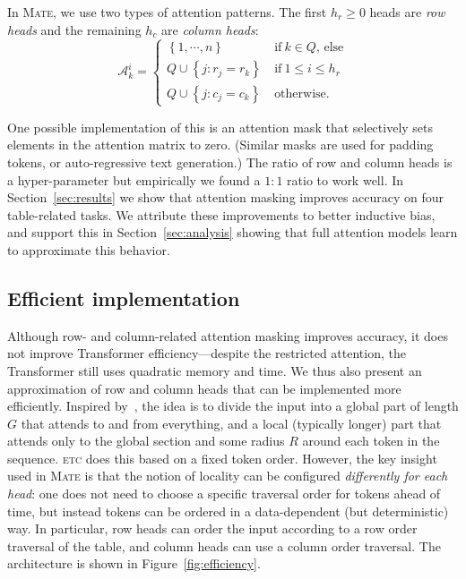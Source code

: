 \documentclass[11pt]{article}
\newcommand{\etc}{\textsc{etc}\xspace}
\newcommand{\model}{\textsc{Mate}\xspace}
\begin{document}
In \model, we use two types of attention patterns. The first $h_r\geq 0$ heads are \emph{row heads} and the remaining $h_c$ are \emph{column heads}:
\vspace{-2.5mm}
\[
\mathcal{A}^i_k = \begin{cases}
\left\{1,\cdots,n\right\} &~\text{if}~ k \in Q\text{, else} \\
Q \cup \left\{j : r_j = r_k\right\} &~\text{if}~ 1 \leq i \leq h_r \\
Q \cup \left\{j : c_j = c_k\right\} &~\text{otherwise.}
\end{cases}
\]

One possible implementation of this is an attention mask that selectively sets elements in the attention matrix to zero. (Similar masks are used for padding tokens, or auto-regressive text generation.) 
The ratio of row and column
heads is a hyper-parameter but empirically we found a $1:1$ ratio to work well.
In Section~\ref{sec:results}
we show that attention masking improves accuracy on four table-related tasks.
We attribute these improvements to better inductive bias, and support this in Section~\ref{sec:analysis} showing that full attention models learn to approximate this behavior.

\subsection{Efficient implementation}

Although row- and column-related attention masking improves accuracy, it does not improve Transformer efficiency---despite the restricted attention, the Transformer still uses quadratic memory and time.  We thus also present an approximation of row and column heads that can be implemented more efficiently.
Inspired by~\citet{ainslie-etal-2020-etc}, the idea is to divide the input into
a global part of length $G$ that attends to and from everything, and a local (typically longer) part that attends only to the global section and some radius $R$ around each token in the  sequence. 
\etc does this based on a fixed token order.
However, the key insight used in \model is that the notion of locality can be configured \textit{differently for each head}: one does not need to choose a specific traversal order for tokens ahead of time, but instead tokens can be ordered in a data-dependent (but deterministic) way.
In particular, row heads can order the input according to a row order traversal of the table, and column heads can use a column order traversal.
The architecture is shown in Figure~\ref{fig:efficiency}.
\end{document}
